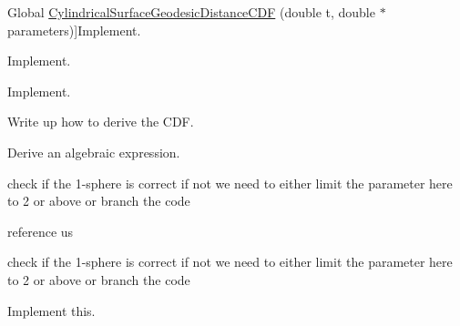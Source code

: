 \begin{DoxyRefList}
\hypertarget{todo__todo000009}{}%
Global \hyperlink{_cylindrical_surface_geodesic_8h_a3dae4ac1d92551a685e6ea0faa08c3a4}{Cylindrical\-Surface\-Geodesic\-Distance\-C\-D\-F} (double t, double $\ast$parameters)]Implement.  
\item[\label{todo__todo000010}%
\hypertarget{todo__todo000010}{}%
Global \hyperlink{_cylindrical_surface_geodesic_8h_a19c13f8592dcc528d0aaef9ea939ea9e}{Cylindrical\-Surface\-Geodesic\-Distance\-Mean} (double $\ast$parameters)]Implement.  
\item[\label{todo__todo000011}%
\hypertarget{todo__todo000011}{}%
Global \hyperlink{_cylindrical_surface_geodesic_8h_a6d5d130e133a07607923b92afa5bb1f6}{Cylindrical\-Surface\-Geodesic\-Distance\-Var} (double $\ast$parameters)]Implement.  
\item[\label{todo__todo000012}%
\hypertarget{todo__todo000012}{}%
Global \hyperlink{_disk_8h_a8958adae00c0c55d68c1e81deb51c06b}{Disk\-Distance\-C\-D\-F} (double a, double $\ast$b)]Write up how to derive the C\-D\-F.  
\item[\label{todo__todo000013}%
\hypertarget{todo__todo000013}{}%
Global \hyperlink{_disk_8h_a156ab336770f189207572a9282158392}{Disk\-Distance\-Var} (double $\ast$parameters)]Derive an algebraic expression.  
\item[\label{todo__todo000016}%
\hypertarget{todo__todo000016}{}%
Global \hyperlink{_hyper_sphere_8h_a1fd054315809f3be16b79fc198a2a9b8}{Hyper\-Sphere\-Distance\-Check\-Parameters} (double $\ast$parameters, int $\ast$result, char $\ast$error\-\_\-str)]check if the 1-\/sphere is correct if not we need to either limit the parameter here to 2 or above or branch the code  
\item[\label{todo__todo000014}%
\hypertarget{todo__todo000014}{}%
Global \hyperlink{_hyper_sphere_8h_ac9f09ad018eaa239847e438a60d75aa3}{Hyper\-Sphere\-Distance\-P\-D\-F} (double t, double $\ast$parameters)]reference us  
\item[\label{todo__todo000019}%
\hypertarget{todo__todo000019}{}%
Global \hyperlink{_hyper_sphere_geodesic_8h_a0d1f54ac3a880c1c99d1ca5e85bd8256}{Hyper\-Sphere\-Geodesic\-Distance\-Check\-Parameters} (double $\ast$parameters, int $\ast$result, char $\ast$error\-\_\-str)]check if the 1-\/sphere is correct if not we need to either limit the parameter here to 2 or above or branch the code  
\item[\label{todo__todo000020}%
\hypertarget{todo__todo000020}{}%
Global \hyperlink{_hyper_sphere_geodesic_8h_a0fbca3fad98c691523aeb34eaab97d01}{Hyper\-Sphere\-Geodesic\-Distance\-Metric} (int Ncoords, double $\ast$point1, double $\ast$point2, double $\ast$parameters)]Implement this.  

\end{DoxyRefList}
